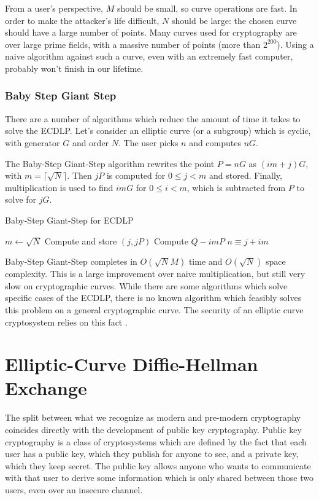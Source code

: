 \documentclass{article}
\begin{document}
From a user's perspective, $M$ should be small, so curve operations are fast.
In order to make the attacker's life difficult, $N$ should be large: the chosen curve should have a large number of points.
Many curves used for cryptography are over large prime fields, with a massive number of points (more than $2^{200}$).
Using a naive algorithm against such a curve, even with an extremely fast computer, probably won't finish in our lifetime.

\subsubsection{Baby Step Giant Step}
There are a number of algorithms which reduce the amount of time it takes to solve the ECDLP.
Let's consider an elliptic curve (or a subgroup) which is cyclic, with generator $G$ and order $N$.
The user picks $n$ and computes $nG$. 

The Baby-Step Giant-Step algorithm rewrites the point $P = nG$ as $(im + j)G$, with $m = \lceil \sqrt{N} \rceil$.
Then $jP$ is computed for $0 \leq j < m$ and stored.
Finally, multiplication is used to find $imG$ for $0 \leq i < m$, which is subtracted from $P$ to solve for $jG$.

\begin{algorithm}
\caption{Baby-Step Giant-Step for ECDLP}
\begin{algorithmic}
\State $m \gets \sqrt{N}$
	\State Compute and store $(j, jP)$
\EndFor
{}
	\State Compute $Q - imP$
		\State \Return $n \equiv j + im$
	\EndIf
\EndFor
\end{algorithmic}
\end{algorithm}

Baby-Step Giant-Step completes in $O(\sqrt{N} M)$ time and $O(\sqrt{N})$ space complexity.
This is a large improvement over naive multiplication, but still very slow on cryptographic curves. 
While there are some algorithms which solve specific cases of the ECDLP, there is no known algorithm which feasibly solves this problem on a general cryptographic curve.
The security of an elliptic curve cryptosystem relies on this fact \cite[\S 5]{washington}.

\clearpage

\section{Elliptic-Curve Diffie-Hellman Exchange}
The split between what we recognize as modern and pre-modern cryptography coincides directly with the development of public key cryptography.
Public key cryptography is a class of cryptosystems which are defined by the fact that each user has a public key, which they publish for anyone to see, and a private key, which they keep secret.
The public key allows anyone who wants to communicate with that user to derive some information which is only shared between those two users, even over an insecure channel.
\end{document}

